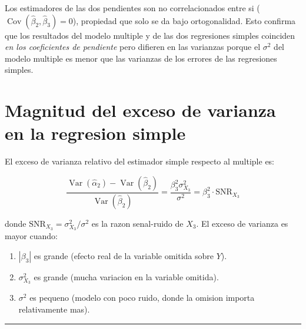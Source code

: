 \documentclass[12pt, letterpaper]{article}
\theoremstyle{remark}
\newcommand{\Var}{\operatorname{Var}}
\newcommand{\Cov}{\operatorname{Cov}}
\begin{document}
Los estimadores de las dos pendientes son no correlacionados entre si
($\Cov(\hat\beta_2, \hat\beta_3) = 0$), propiedad que solo se da bajo
ortogonalidad. Esto confirma que los resultados del modelo multiple y de
las dos regresiones simples coinciden \emph{en los coeficientes de
pendiente} pero difieren en las varianzas porque el $\sigma^2$ del modelo
multiple es menor que las varianzas de los errores de las regresiones simples.

\section{Magnitud del exceso de varianza en la regresion simple}

El exceso de varianza relativo del estimador simple respecto al multiple es:

\begin{equation}
  \frac{\Var(\hat\alpha_2) - \Var(\hat\beta_2)}{\Var(\hat\beta_2)}
    = \frac{\beta_3^2 \sigma_{X_3}^2}{\sigma^2}
    = \beta_3^2 \cdot \text{SNR}_{X_3}
  \label{eq:exceso_relativo}
\end{equation}

donde $\text{SNR}_{X_3} = \sigma_{X_3}^2/\sigma^2$ es la razon
senal-ruido de $X_3$. El exceso de varianza es mayor cuando:
\begin{enumerate}[leftmargin=1.8em, itemsep=4pt]
  \item $|\beta_3|$ es grande (efecto real de la variable omitida sobre $Y$).
  \item $\sigma_{X_3}^2$ es grande (mucha variacion en la variable omitida).
  \item $\sigma^2$ es pequeno (modelo con poco ruido, donde la omision
    importa relativamente mas).
\end{enumerate}

\vspace{14pt}
\noindent\rule{\linewidth}{0.4pt}

\end{document}
